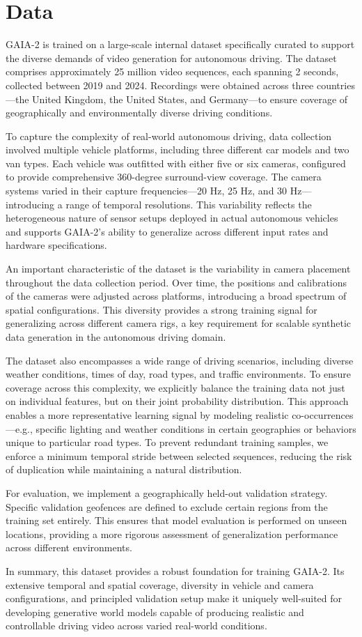 \section{Data}
\label{section:data}

GAIA-2 is trained on a large-scale internal dataset specifically curated to support the diverse demands of video generation for autonomous driving. The dataset comprises approximately 25 million video sequences, each spanning 2 seconds, collected between 2019 and 2024. Recordings were obtained across three countries—the United Kingdom, the United States, and Germany—to ensure coverage of geographically and environmentally diverse driving conditions.

To capture the complexity of real-world autonomous driving, data collection involved multiple vehicle platforms, including three different car models and two van types. Each vehicle was outfitted with either five or six cameras, configured to provide comprehensive 360-degree surround-view coverage. The camera systems varied in their capture frequencies—20 Hz, 25 Hz, and 30 Hz—introducing a range of temporal resolutions. This variability reflects the heterogeneous nature of sensor setups deployed in actual autonomous vehicles and supports GAIA-2’s ability to generalize across different input rates and hardware specifications.

An important characteristic of the dataset is the variability in camera placement throughout the data collection period. Over time, the positions and calibrations of the cameras were adjusted across platforms, introducing a broad spectrum of spatial configurations. This diversity provides a strong training signal for generalizing across different camera rigs, a key requirement for scalable synthetic data generation in the autonomous driving domain.

The dataset also encompasses a wide range of driving scenarios, including diverse weather conditions, times of day, road types, and traffic environments. To ensure coverage across this complexity, we explicitly balance the training data not just on individual features, but on their joint probability distribution. This approach enables a more representative learning signal by modeling realistic co-occurrences—e.g., specific lighting and weather conditions in certain geographies or behaviors unique to particular road types. To prevent redundant training samples, we enforce a minimum temporal stride between selected sequences, reducing the risk of duplication while maintaining a natural distribution.

For evaluation, we implement a geographically held-out validation strategy. Specific validation geofences are defined to exclude certain regions from the training set entirely. This ensures that model evaluation is performed on unseen locations, providing a more rigorous assessment of generalization performance across different environments.

In summary, this dataset provides a robust foundation for training GAIA-2. Its extensive temporal and spatial coverage, diversity in vehicle and camera configurations, and principled validation setup make it uniquely well-suited for developing generative world models capable of producing realistic and controllable driving video across varied real-world conditions.